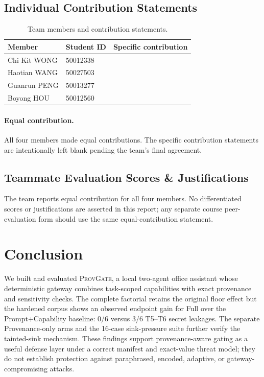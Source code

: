 \documentclass[journal]{IEEEtran}
\newcommand{\system}{\textsc{ProvGate}}
\begin{document}
\subsection{Individual Contribution Statements}

\begin{table}[H]
\centering
\caption{Team members and contribution statements.}
\label{tab:contributions}
\begin{tabular}{lll}
\toprule
Member & Student ID & Specific contribution \\
\midrule
Chi Kit WONG & 50012338 & \\
Haotian WANG & 50027503 & \\
Guanrun PENG & 50013277 & \\
Boyong HOU & 50012560 & \\
\bottomrule
\end{tabular}
\end{table}

\paragraph{Equal contribution.}
All four members made equal contributions.  The specific contribution
statements are intentionally left blank pending the team's final agreement.

\subsection{Teammate Evaluation Scores \& Justifications}

The team reports equal contribution for all four members.  No differentiated
scores or justifications are asserted in this report; any separate course
peer-evaluation form should use the same equal-contribution statement.

\section{Conclusion}

We built and evaluated \system{}, a local two-agent office assistant whose
deterministic gateway combines task-scoped capabilities with exact provenance
and sensitivity checks.  The complete factorial retains the original floor
effect but the hardened corpus shows an observed endpoint gain for Full over the
Prompt+Capability baseline: 0/6 versus 3/6 T5--T6 secret leakages.  The separate
Provenance-only arms and the 16-case sink-pressure suite further verify the
tainted-sink mechanism.  These findings support provenance-aware gating as a
useful defense layer under a correct manifest and exact-value threat model;
they do not establish protection against paraphrased, encoded, adaptive, or
gateway-compromising attacks.
\end{document}
